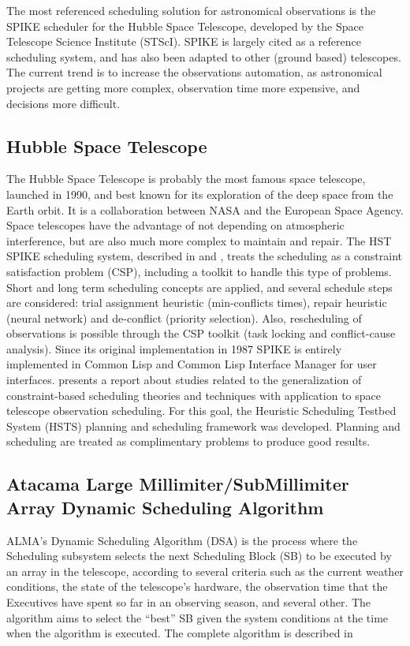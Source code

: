 The most referenced scheduling solution for astronomical observations is the SPIKE scheduler for the Hubble Space Telescope, developed by the Space Telescope Science Institute (STScI). SPIKE is largely cited as a reference scheduling system, and has also been adapted to other (ground based) telescopes. The current trend is to increase the observations automation, as astronomical projects are getting more complex, observation time more expensive, and decisions more difficult.

\subsection{Hubble Space Telescope}
The Hubble Space Telescope is probably the most famous space telescope, launched in 1990, and best known for its exploration of the deep space from the Earth orbit. It is a collaboration between NASA and the European Space Agency. Space telescopes have the advantage of not depending on atmospheric interference, but are also much more complex to maintain and repair. The HST SPIKE scheduling system, described in \cite{johnston90} and \cite{zweben94}, treats the scheduling as a constraint satisfaction problem (CSP), including a toolkit to handle this type of problems. Short and long term scheduling concepts are applied, and several schedule steps are considered: trial assignment heuristic (min-conflicts times), repair heuristic (neural network) and de-conflict (priority selection). Also, rescheduling of observations is possible through the CSP toolkit (task locking and conflict-cause analysis). Since its original implementation in 1987 SPIKE is entirely implemented in Common Lisp and Common Lisp Interface Manager for user interfaces. \cite{muscettola96} presents a report about studies related to the generalization of constraint-based scheduling theories and techniques with application to space telescope observation scheduling. For this goal, the Heuristic Scheduling Testbed System (HSTS) planning and scheduling framework was developed. Planning and scheduling are treated as complimentary problems to produce good results.

\subsection{Atacama Large Millimiter/SubMillimiter Array Dynamic Scheduling Algorithm}
\label{sec:alma-dsa}

ALMA's Dynamic Scheduling Algorithm (DSA) is the process where the Scheduling subsystem selects the next Scheduling Block (SB) to be executed by an array in the telescope, according to several criteria such as the current weather conditions, the state of the telescope's hardware, the observation time that the Executives have spent so far in an observing season, and several other. The algorithm aims to select the ``best'' SB given the system conditions at the time when the algorithm is executed. The complete algorithm is described in \cite{avarias11} 

